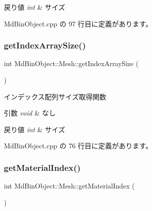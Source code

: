 \begin{DoxyRetVals}{戻り値}
{\em int} & サイズ \\
\hline
\end{DoxyRetVals}


 Md\+Bin\+Object.\+cpp の 97 行目に定義があります。

\mbox{\label{class_md_bin_object_1_1_mesh_a8ceb4bee2ee47a34362083f0e95c3cad}} 
\subsubsection{\texorpdfstring{get\+Index\+Array\+Size()}{getIndexArraySize()}}
{\footnotesize\ttfamily int Md\+Bin\+Object\+::\+Mesh\+::get\+Index\+Array\+Size (\begin{DoxyParamCaption}{ }\end{DoxyParamCaption})}



インデックス配列サイズ取得関数 


\begin{DoxyParams}{引数}
{\em void} & なし \\
\hline
\end{DoxyParams}

\begin{DoxyRetVals}{戻り値}
{\em int} & サイズ \\
\hline
\end{DoxyRetVals}


 Md\+Bin\+Object.\+cpp の 76 行目に定義があります。

\mbox{\label{class_md_bin_object_1_1_mesh_a73edae81060b25b68f5008930180e210}} 
\subsubsection{\texorpdfstring{get\+Material\+Index()}{getMaterialIndex()}}
{\footnotesize\ttfamily int Md\+Bin\+Object\+::\+Mesh\+::get\+Material\+Index (\begin{DoxyParamCaption}{ }\end{DoxyParamCaption})}




